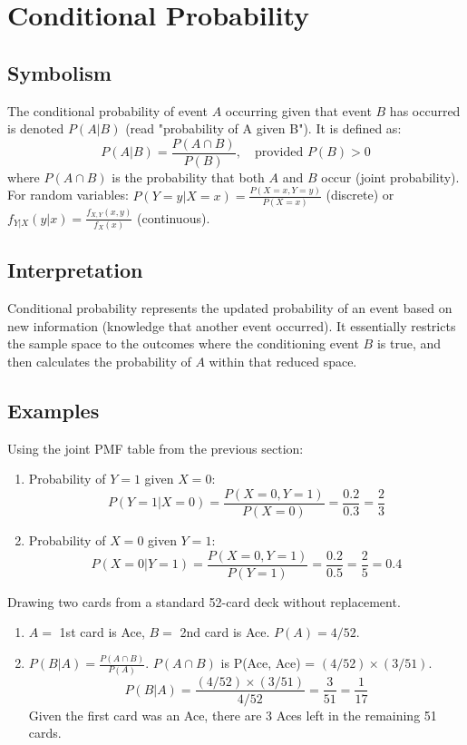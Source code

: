\documentclass{article}
\begin{document}
\section{Conditional Probability}

\subsection*{Symbolism}
The conditional probability of event $A$ occurring given that event $B$ has occurred is denoted $P(A|B)$ (read "probability of A given B"). It is defined as:
\[ P(A|B) = \frac{P(A \cap B)}{P(B)}, \quad \text{provided } P(B) > 0 \]
where $P(A \cap B)$ is the probability that both $A$ and $B$ occur (joint probability).
For random variables: $P(Y=y | X=x) = \frac{P(X=x, Y=y)}{P(X=x)}$ (discrete) or $f_{Y|X}(y|x) = \frac{f_{X,Y}(x,y)}{f_X(x)}$ (continuous).

\subsection*{Interpretation}
Conditional probability represents the updated probability of an event based on new information (knowledge that another event occurred). It essentially restricts the sample space to the outcomes where the conditioning event $B$ is true, and then calculates the probability of $A$ within that reduced space.

\subsection*{Examples}
Using the joint PMF table from the previous section:
\begin{enumerate}
    \item Probability of $Y=1$ given $X=0$:
    \[ P(Y=1 | X=0) = \frac{P(X=0, Y=1)}{P(X=0)} = \frac{0.2}{0.3} = \frac{2}{3} \]
    \item Probability of $X=0$ given $Y=1$:
    \[ P(X=0 | Y=1) = \frac{P(X=0, Y=1)}{P(Y=1)} = \frac{0.2}{0.5} = \frac{2}{5} = 0.4 \]
\end{enumerate}
Drawing two cards from a standard 52-card deck without replacement.
\begin{enumerate}
    \item $A=$ 1st card is Ace, $B=$ 2nd card is Ace. $P(A) = 4/52$.
    \item $P(B|A) = \frac{P(A \cap B)}{P(A)}$. $P(A \cap B)$ is P(Ace, Ace) = $(4/52) \times (3/51)$.
    \[ P(B|A) = \frac{(4/52) \times (3/51)}{4/52} = \frac{3}{51} = \frac{1}{17} \]
    Given the first card was an Ace, there are 3 Aces left in the remaining 51 cards.
\end{enumerate}
\end{document}
